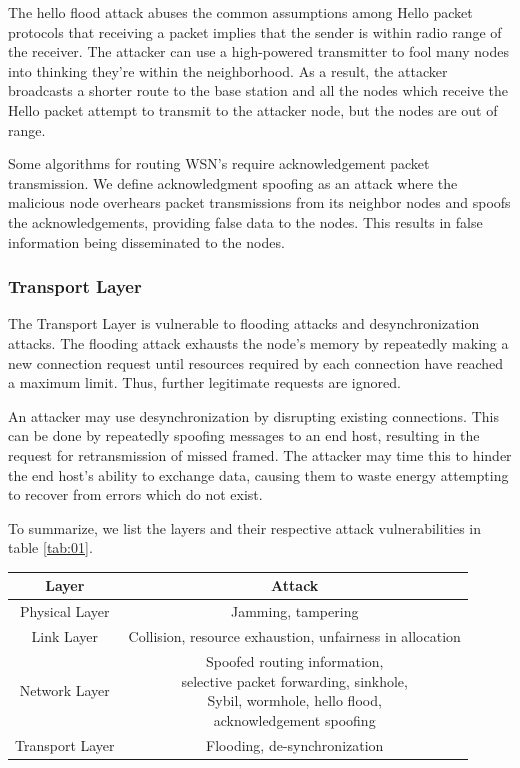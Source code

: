 \documentclass[12pt,a4paper,twoside]{report}
\begin{document}
The hello flood attack abuses the common assumptions among Hello packet protocols that receiving a packet implies that the sender is within radio range of the receiver. The attacker can use a high-powered transmitter to fool many nodes into thinking they're within the neighborhood. As a result, the attacker broadcasts a shorter route to the base station and all the nodes which receive the Hello packet attempt to transmit to the attacker node, but the nodes are out of range. \par
Some algorithms for routing WSN's require acknowledgement packet transmission. We define acknowledgment spoofing as an attack where the malicious node overhears packet transmissions from its neighbor nodes and spoofs the acknowledgements, providing false data to the nodes. This results in false information being disseminated to the nodes. \par
\subsubsection{Transport Layer}
The Transport Layer is vulnerable to flooding attacks and desynchronization attacks. The flooding attack exhausts the node's memory by repeatedly making a new connection request until resources required by each connection have reached a maximum limit. Thus, further legitimate requests are ignored.\par
An attacker may use desynchronization by disrupting existing connections. This can be done by repeatedly spoofing messages to an end host, resulting in the request for retransmission of missed framed. The attacker may time this to hinder the end host's ability to exchange data, causing them to waste energy attempting to recover from errors which do not exist. \par
To summarize, we list the layers and their respective attack vulnerabilities in table \ref{tab:01}.  \par
\FloatBarrier
  \begin{table}[h]
  	\begin{center}
    \begin{tabular}{|c|c|} \hline
	        Layer & Attack \\ \hline\hline
	        Physical Layer & Jamming, tampering \\ \hline
	        Link Layer & Collision, resource exhaustion, unfairness in allocation \\ \hline
	        Network Layer & \shortstack{Spoofed routing information, \\selective packet forwarding, sinkhole,\\ Sybil, wormhole, hello flood, \\acknowledgement spoofing} \\ \hline
	        Transport Layer & Flooding, de-synchronization \\ \hline
	  \end{tabular}
	  \end{center}
  \end{table}
  \label{tab:01}
\FloatBarrier
\end{document}
